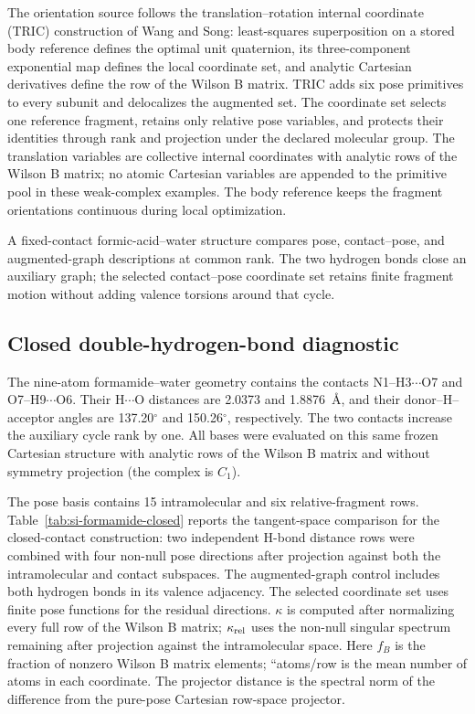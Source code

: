 \documentclass[10pt]{article}
\begin{document}
The orientation source follows the {translation--rotation
internal coordinate (TRIC)} construction of Wang and
Song:\cite{WangSong2016GeomeTRIC} least-squares superposition on a stored body reference defines the
optimal unit quaternion, its three-component exponential map defines the local
{coordinate set}, and analytic Cartesian derivatives define the {row of the Wilson B matrix}.  TRIC adds
six pose primitives to every subunit and delocalizes the augmented set.  The
coordinate set selects one reference fragment, retains
only relative pose variables, and protects their identities through rank and
projection under the declared molecular group.  The translation variables are
collective internal coordinates with analytic {rows of the Wilson B matrix}; no atomic Cartesian
variables are appended to the primitive pool in these weak-complex examples.
The body reference keeps the fragment orientations continuous during local optimization.

{A fixed-contact formic-acid--water structure compares pose,
contact--pose, and augmented-graph descriptions at common rank.  The two
hydrogen bonds close an auxiliary graph; the selected contact--pose coordinate set
retains finite fragment motion without adding valence torsions around that
cycle.}

\subsection{Closed double-hydrogen-bond diagnostic}

The nine-atom formamide--water geometry contains the contacts
N1--H3\(\cdots\)O7 and O7--H9\(\cdots\)O6.  Their H\(\cdots\)O distances are
2.0373 and 1.8876~\AA, and their donor--H--acceptor angles are
137.20\(^{\circ}\) and 150.26\(^{\circ}\), respectively.  The two contacts
increase the auxiliary cycle rank by one.  All bases were evaluated on this
same frozen Cartesian structure with analytic {rows of the Wilson B matrix} and without
symmetry projection (the complex is \(C_1\)).

The pose basis contains 15 intramolecular and six relative-fragment rows.
Table~\ref{tab:si-formamide-closed} reports the tangent-space
comparison for the closed-contact construction: two independent H-bond
distance rows were combined with four non-null pose directions after
projection against both the intramolecular and contact subspaces.  {The
augmented-graph control includes both hydrogen bonds in its valence adjacency.
The selected coordinate set uses finite pose functions for the residual directions.}
\(\kappa\) is computed after
normalizing every full {row of the Wilson B matrix}; \(\kappa_{\rm rel}\) uses the non-null
singular spectrum remaining after projection against the intramolecular
space.  Here \(f_B\) is the fraction of nonzero Wilson B matrix elements;
``atoms/row is the mean number of atoms in each coordinate. The projector
distance is the spectral norm of the difference from the pure-pose Cartesian
row-space projector.
\end{document}
